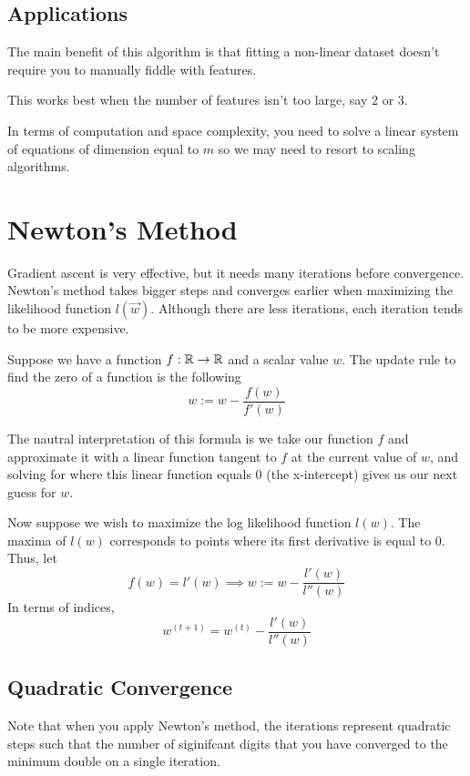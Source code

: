 \documentclass[12pt]{scrartcl}
\begin{document}
\subsection{Applications}

The main benefit of this algorithm is that fitting a non-linear dataset doesn't require you to manually fiddle with features.

\begin{note}
    This works best when the number of features isn't too large, say 2 or 3.
\end{note}

In terms of computation and space complexity, you need to solve a linear system of equations of dimension equal to $m$ so we may need to resort to scaling algorithms.

\section{Newton's Method}

Gradient ascent is very effective, but it needs many iterations before
convergence. Newton's method takes bigger steps
and converges earlier when maximizing the likelihood function
$l(\vec{w})$. Although there are less iterations, each
iteration tends to be more expensive.

\begin{lemma}
    Suppose we have a function $f: \mathbb R \to \mathbb R$
    and a scalar value $w$. The update rule 
    to find the zero of a function is the following
    \[w := w - \frac{f(w)}{f'(w)}\]

    The nautral interpretation of this formula is 
    we take our function $f$ and approximate it with a linear
    function tangent to $f$ at the current value of 
    $w$, and solving for where this linear function 
    equals 0 (the x-intercept) gives us our next guess
    for $w$.
\end{lemma}

Now suppose we wish to maximize the log likelihood 
function $l(w)$. The maxima of $l(w)$ corresponds to points
where its first derivative is equal to 0. Thus, let 
\[f(w) = l'(w) \implies w := w - \frac{l'(w)}{l''(w)}\]
In terms of indices, 
\[w^{(t+1)} = w^{(t)} - \frac{l'(w)}{l''(w)}\]

\subsection{Quadratic Convergence}
Note that when you apply Newton's method,
the iterations represent quadratic steps 
such that the number of siginifcant digits that
you have converged to the minimum double on a single 
iteration.
\end{document}

